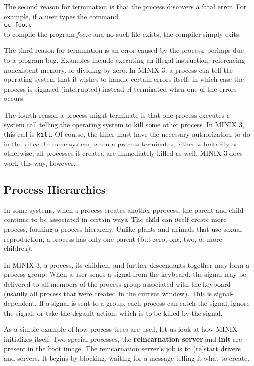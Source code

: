 \documentclass{book}
\newcommand {\kw}  [1] {\textbf{#1}}
\newcommand {\sys} [1] {\textsl{#1}}
\newcommand {\cmd} [1] {\texttt{#1}}
\begin{document}
The second reason for termination is that the process discovers a fatal error.
For example, if a user types the command\\
\cmd{cc foo.c}\\
to compile the program \sys{foo.c} and no such file exists, the compiler simply exits.

The third reason for termination is an error caused by the process, perhaps due to a program bug.
Examples include executing an illegal instruction, referencing nonexistent memory, or dividing by zero.
In MINIX 3, a process can tell the operating system that it wishes to handle certain errors itself,
in which case the process is signaled (interrupted) instead of terminated when one of the errors occurs.

The fourth reason a process might terminate is that one process executes a system call telling the operating system to kill some other process.
In MINIX 3, this call is \cmd{kill}.
Of course, the killer must have the necessary authorization to do in the killee.
In some system, when a process terminates, either voluntarily or otherwise,
all processes it created are immediately killed as well.
MINIX 3 does work this way, however.

\subsection{Process Hierarchies}
In some systems, when a process creates another pprocess,
the parent and child continue to be associated in certain ways.
The child can itself create more process, forming a process hierarchy.
Unlike plants and animals that use sexual reproduction,
a process has only one parent (but zero, one, two, or more children).

In MINIX 3, a process, its children, and further descendants together may form a process group.
When a user sends a signal from the keyboard, the signal may be delivered to all members of the process group
associated with the keyboard (usaully all process that were created in the current window).
This is signal-dependent.
If a signal is sent to a group, each process can catch the signal, ignore the signal, or take the degault action,
which is to be killed by the signal.

As a simple example of how process trees are used, let us look at how MINIX initializes itself.
Two special processes, the \kw{reincarnation server} and \kw{init} are present in the boot image.
The reincarnation server's job is to (re)start drivers and servers.
It begins by blocking, waiting for a message telling it what to create.
\end{document}
